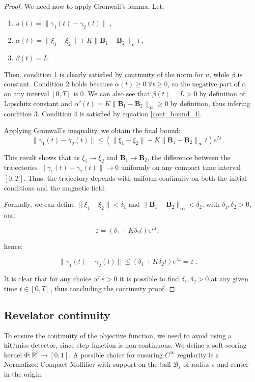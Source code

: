 \documentclass{article}
\begin{document}
\begin{proof}
		We need now to apply Gronwall's lemma. Let:
		\begin{enumerate}
			\item $u(t) = \|\gamma_1(t) - \gamma_2(t)\| \ ,$
			\item $\alpha(t) = \|\xi_1 - \xi_2\| +  K\|\mathbf{B}_1 - \mathbf{B}_2\|_\infty t \ ,$
			\item $\beta(t) = L$.
		\end{enumerate}
		
		Then, condition 1 is clearly satisfied by continuity of the norm for $u$, while $\beta$ is constant. Condition 2 holds because $\alpha(t) \geq 0 \ \forall t \geq 0$, so the negative part of $\alpha$ on any interval $[0, T]$ is 0. We can also see that $\beta(t) = L > 0$ by definition of Lipschitz constant and $\alpha ' (t) = K \|\mathbf{B}_1 - \mathbf{B}_2\|_\infty \geq 0$ by definition, thus infering condition 3. Condition 4 is satisfied by equation \eqref{cont_bound_1}.
		
		Applying Grönwall's inequality, we obtain the final bound:
		\begin{equation} \label{eq:gronwall_bound}
			\|\gamma_1(t) - \gamma_2(t)\| \le \left( \|\xi_1 - \xi_2\| + K \|\mathbf{B}_1 - \mathbf{B}_2\|_\infty t \right) e^{Lt}.
		\end{equation}
		
		This result shows that as $\xi_1 \to \xi_2$ and $\mathbf{B}_1 \to \mathbf{B}_2$, the difference between the trajectories $\|\gamma_1(t) - \gamma_2(t)\| \to 0$ uniformly on any compact time interval $[0, T]$. Thus, the trajectory depends with uniform continuity on both the initial conditions and the magnetic field.
		
		Formally, we can define $\|\xi_1 - \xi_2\| < \delta_1$ and $\|\mathbf{B}_1 - \mathbf{B}_2\|_\infty < \delta_2$, with $\delta_1, \delta_2 > 0$, and:
		
		$$\varepsilon = (\delta_1 + K \delta_2 t) e^{Lt},$$
		
		hence:
		
		$$\|\gamma_1(t) - \gamma_2(t)\| \leq (\delta_1 + K \delta_2 t) e^{Lt} = \varepsilon \ .$$
		
		It is clear that for any choice of $\varepsilon > 0$ it is possible to find $\delta_1, \delta_2 > 0$ at any given time $t \in [0, T]$, thus concluding the continuity proof.
		
	\end{proof}
	
	
	
	\subsection{Revelator continuity}
	To ensure the continuity of the objective function, we need to avoid using a hit/miss detector, since step function is non continuous. We define a soft scoring kernel $\Phi: \mathbb{R}^3 \to [0, 1]$. A possible choice for ensuring $C^\infty$ regularity is a Normalized Compact Mollifier with support on the ball $\mathcal{B}_\varepsilon$ of radius $\epsilon$ and center in the origin:
	
\end{document}
